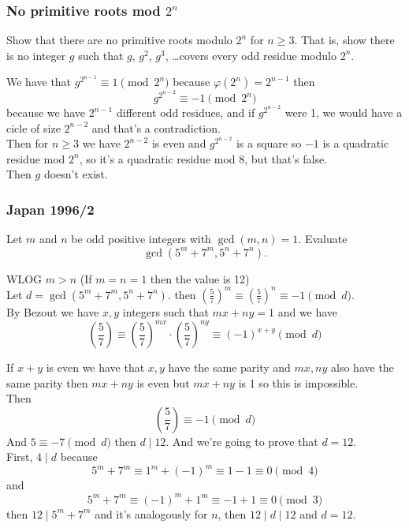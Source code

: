 \documentclass[11pt]{scrartcl}
\begin{document}
        \subsubsection{No primitive roots mod $2^n$}
  
        \begin{mdframed}[style=mdpurplebox, frametitle={No primitive roots mod $2^n$}]
          Show that there are no primitive roots modulo $2^n$ for $n \ge 3$.
          That is, show there is no integer $g$ such that
          $g$, $g^2$, $g^3$, \dots covers every odd residue modulo $2^n$.
        \end{mdframed}
        
        \begin{soln}
        We have that $g^{2^{n-1}} \equiv 1 \pmod{2^n}$ because $\varphi \left( 2^{n} \right)=2^{n-1}$ then 
        $$g^{2^{n-2}} \equiv -1 \pmod{2^n}$$
        because we have $2^{n-1}$ different odd residues, and if $g^{2^{n-2}}$ were 1, we would have a cicle of size $2^{n-2}$ and that's a contradiction. \\
        Then for $n\ge 3$ we have $2^{n-2}$ is even and $g^{2^{n-2}}$ is a square so $-1$ is a quadratic residue mod $2^n$, so it's a quadratic residue mod $8$, but that's false. \\
        Then $g$ doesn't exist.  
        \end{soln}
	
\newpage
\subsubsection{Japan 1996/2}
\begin{mdframed}[style=mdpurplebox, frametitle={Japan 1996/2}]
  Let $m$ and $n$ be odd positive integers with $\gcd(m,n)=1$.
  Evaluate \[ \gcd(5^m+7^m, 5^n+7^n). \]
\end{mdframed}

\begin{soln}
WLOG $m>n$  (If $m=n=1$ then the value is 12) \\
Let $d=\gcd(5^m+7^m, 5^n+7^n).$ then $\left( \frac 5 7 \right)^{m} \equiv \left( \frac 5 7 \right )^{n}  \equiv -1 \pmod{d}$. \\
By Bezout we have $x,y$ integers such that $mx+ny = 1$ and we have 
\[  \left( \frac 5 7 \right) \equiv\left( \frac 5 7 \right)^{mx} \cdot \left( \frac 5 7 \right)^{ny} \equiv \left( -1 \right)^{x+y} \pmod{d} \]

If $x+y$ is even we have that $x,y$ have the same parity and $mx, ny$ also have the same parity then $mx+ny$ is even but $mx+ny$ is 1 so this is impossible. \\
Then  
\[ \left( \frac 5 7 \right)\equiv -1  \pmod d \]
And $ 5 \equiv -7 \pmod d$ then $d \mid 12$.  And we're going to prove that $d=12$. \\
First, $4 \mid d$ because 
$$5^m+7^m \equiv 1^m + (-1)^m \equiv 1-1 \equiv 0 \pmod 4$$
and 
$$5^m+7^m \equiv (-1)^m+1^m \equiv -1+1 \equiv 0 \pmod 3$$
then $12 \mid 5^m+7^m$ and it's analogously for $n$, then $12 \mid d \mid 12$ and $d=12$. 
\end{soln}
\end{document}
